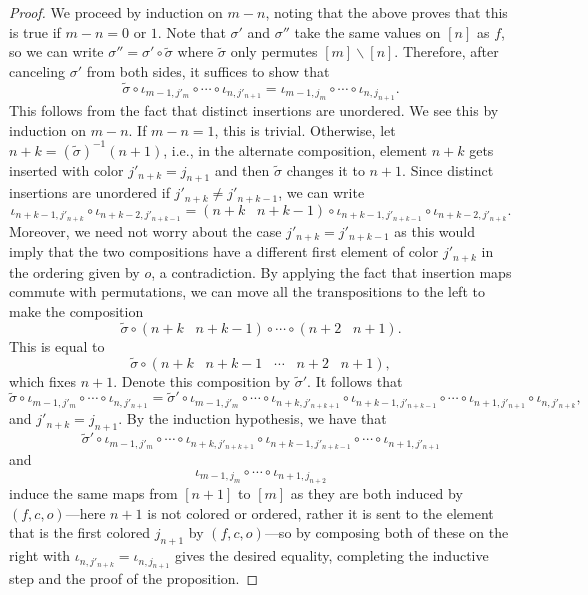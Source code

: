 \documentclass[pagebackref,colorlinks,citecolor=blue,linkcolor=blue,urlcolor=blue,filecolor=blue]{article}
\theoremstyle{definition}\newtheorem{definition}[thm]{Definition}
\theoremstyle{definition}
\begin{document}
\begin{proof}
We proceed by induction on $m-n$, noting that the above proves that this is true if $m-n=0$ or $1$.
Note that $\sigma'$ and $\sigma''$ take the same values on $[n]$ as $f$, so we can write $\sigma''=\sigma'\circ \tilde{\sigma}$ where $\tilde{\sigma}$ only permutes $[m]\backslash[n]$.
Therefore, after canceling $\sigma'$ from both sides, it suffices to show that 
\[
\tilde{\sigma}\circ\iota_{m-1, j'_{m}}\circ\cdots\circ\iota_{n, j'_{n+1}}=\iota_{m-1, j_{m}}\circ \cdots\circ\iota_{n, j_{n+1}}.
\]
This follows from the fact that distinct insertions are unordered.
We see this by induction on $m-n$.
If $m-n=1$, this is trivial.
Otherwise, let $n+k=(\tilde{\sigma})^{-1}(n+1)$, i.e., in the alternate composition, element $n+k$ gets inserted with color $j'_{n+k}=j_{n+1}$ and then $\tilde{\sigma}$ changes it to $n+1$.
Since distinct insertions are unordered if $j'_{n+k}\neq j'_{n+k-1}$, we can write
\[
\iota_{n+k-1, j'_{n+k}}\circ\iota_{n+k-2, j'_{n+k-1}}=(n+k\;\;\;n+k-1)\circ \iota_{n+k-1, j'_{n+k-1}}\circ\iota_{n+k-2, j'_{n+k}}.
\]
Moreover, we need not worry about the case $j'_{n+k}=j'_{n+k-1}$ as this would imply that the two compositions have a different first element of color $j'_{n+k}$ in the ordering given by $o$, a contradiction.
By applying the fact that insertion maps commute with permutations, we can move all the transpositions to the left to make the composition
\[
\tilde{\sigma}\circ (n+k\;\;\; n+k-1)\circ\cdots\circ (n+2\;\;\; n+1).
\]
This is equal to 
\[
\tilde{\sigma}\circ(n+k\;\;\;n+k-1\;\;\;\cdots\;\;\; n+2\;\;\; n+1),
\]
which fixes $n+1$.
Denote this composition by $\tilde{\sigma}'$.
It follows that
\[
\tilde{\sigma}\circ\iota_{m-1, j'_{m}}\circ\cdots\circ\iota_{n, j'_{n+1}}=\tilde{\sigma}'\circ \iota_{m-1, j'_{m}}\circ\cdots\circ\iota_{n+k, j'_{n+k+1}}\circ \iota_{n+k-1, j'_{n+k-1}}\circ\cdots\circ\iota_{n+1, j'_{n+1}}\circ\iota_{n, j'_{n+k}},
\]
and $j'_{n+k}=j_{n+1}$.
By the induction hypothesis, we have that 
\[
\tilde{\sigma}'\circ \iota_{m-1, j'_{m}}\circ\cdots\circ\iota_{n+k, j'_{n+k+1}}\circ\iota_{n+k-1, j'_{n+k-1}}\circ\cdots\circ\iota_{n+1, j'_{n+1}}
\]
and
\[
\iota_{m-1, j_{m}}\circ\cdots\circ\iota_{n+1, j_{n+2}}
\]
induce the same maps from $[n+1]$ to $[m]$ as they are both induced by $(f, c, o)$---here $n+1$ is not colored or ordered, rather it is sent to the element that is the first colored $j_{n+1}$ by  $(f, c, o)$---so by composing both of these on the right with $\iota_{n, j'_{n+k}}=\iota_{n, j_{n+1}}$ gives the desired equality, completing the inductive step and the proof of the proposition.
\end{proof}
\end{document}
